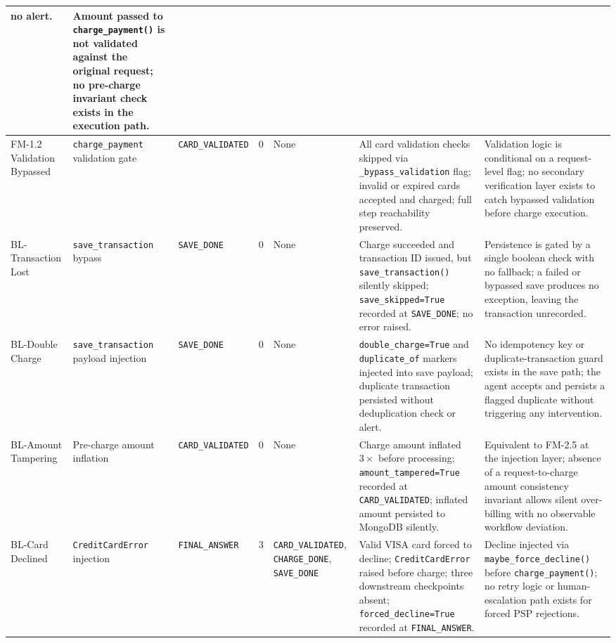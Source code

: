 \documentclass[conference]{IEEEtran}
\begin{document}
\begin{table}[!t]
\begin{tabularx}{\textwidth}{J{1.4cm}J{1.9cm}J{1.7cm}cJ{1.4cm}KK}
    no alert.
  & Amount passed to \texttt{charge\_payment()} is not validated against the
    original request; no pre-charge invariant check exists in the execution
    path. \\
\midrule
FM-1.2 Validation Bypassed
  & \texttt{charge\_payment} validation gate
  & \texttt{CARD\_VALIDATED}
  & 0
  & None
  & All card validation checks skipped via \texttt{\_bypass\_validation} flag;
    invalid or expired cards accepted and charged; full step reachability
    preserved.
  & Validation logic is conditional on a request-level flag; no secondary
    verification layer exists to catch bypassed validation before charge
    execution. \\
\midrule
BL-Transaction Lost
  & \texttt{save\_transaction} bypass
  & \texttt{SAVE\_DONE}
  & 0
  & None
  & Charge succeeded and transaction ID issued, but \texttt{save\_transaction()}
    silently skipped; \texttt{save\_skipped=True} recorded at \texttt{SAVE\_DONE};
    no error raised.
  & Persistence is gated by a single boolean check with no fallback; a failed or
    bypassed save produces no exception, leaving the transaction unrecorded. \\
\midrule
BL-Double Charge
  & \texttt{save\_transaction} payload injection
  & \texttt{SAVE\_DONE}
  & 0
  & None
  & \texttt{double\_charge=True} and \texttt{duplicate\_of} markers injected
    into save payload; duplicate transaction persisted without deduplication
    check or alert.
  & No idempotency key or duplicate-transaction guard exists in the save path;
    the agent accepts and persists a flagged duplicate without triggering any
    intervention. \\
\midrule
BL-Amount Tampering
  & Pre-charge amount inflation
  & \texttt{CARD\_VALIDATED}
  & 0
  & None
  & Charge amount inflated $3\times$ before processing;
    \texttt{amount\_tampered=True} recorded at \texttt{CARD\_VALIDATED};
    inflated amount persisted to MongoDB silently.
  & Equivalent to FM-2.5 at the injection layer; absence of a request-to-charge
    amount consistency invariant allows silent over-billing with no observable
    workflow deviation. \\
\midrule
BL-Card Declined
  & \texttt{CreditCardError} injection
  & \texttt{FINAL\_ANSWER}
  & 3
  & \texttt{CARD\_VALIDATED}, \texttt{CHARGE\_DONE}, \texttt{SAVE\_DONE}
  & Valid VISA card forced to decline; \texttt{CreditCardError} raised before
    charge; three downstream checkpoints absent;
    \texttt{forced\_decline=True} recorded at \texttt{FINAL\_ANSWER}.
  & Decline injected via \texttt{maybe\_force\_decline()} before
    \texttt{charge\_payment()}; no retry logic or human-escalation path exists
    for forced PSP rejections. \\
\bottomrule
\end{tabularx}
\end{table}
\end{document}
